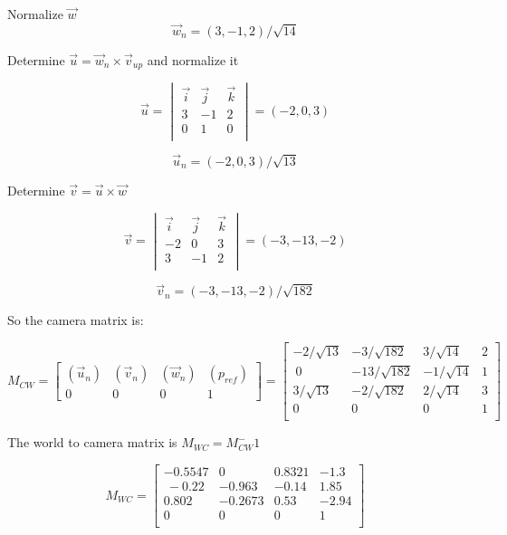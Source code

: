 \documentclass[a4paper,10pt]{scrartcl}
\begin{document}
Normalize $\vec w $
\[ \vec w_n = (3, -1, 2)/\sqrt{14}\]

Determine $\vec u = \vec w_n \times \vec v_{up}$ and normalize it

\[ \vec u = \begin{vmatrix} \vec i &\vec j &\vec k \\
	      3 & -1 & 2 \\
	      0 & 1 & 0\\             
            \end{vmatrix} = (-2, 0, 3)
\]

\[ \vec u_n = (-2, 0, 3) / \sqrt{13}\]

Determine $\vec v = \vec u \times \vec w$

\[ \vec v = \begin{vmatrix} \vec i &\vec j &\vec k \\
	      -2 & 0 & 3\\             
	      3 & -1 & 2 \\	      
            \end{vmatrix} = (-3, -13, -2)\]
            
\[ \vec v_n = (-3, -13, -2) / \sqrt{182}\]


So the camera matrix is:

\[ M_{CW} = \begin{bmatrix}
	      (\vec u_n) & (\vec v_n) & (\vec w_n) & (p_{ref}) \\
	      0 & 0 & 0 & 1
            \end{bmatrix} = 
            \begin{bmatrix}
	      -2/\sqrt{13} & -3/\sqrt{182} & 3/\sqrt{14} & 2 \\\
	      0 & -13/\sqrt{182} & -1/\sqrt{14} & 1 \\
	      3/\sqrt{13} & -2/\sqrt{182} & 2/\sqrt{14} & 3 \\
	      0 & 0 & 0 & 1\\
            \end{bmatrix}            
\]

The world to camera matrix is $M_{WC} = M_{CW}^-1$

\[ M_{WC} =    \begin{bmatrix}
	      -0.5547 & 0 & 0.8321 & -1.3 \\\
	      -0.22 & -0.963 & -0.14 & 1.85 \\
	      0.802 & -0.2673 & 0.53 & -2.94 \\
	      0 & 0 & 0 & 1\\
            \end{bmatrix}\]
\end{document}
